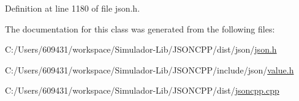 Definition at line 1180 of file json.\+h.



The documentation for this class was generated from the following files\+:\begin{DoxyCompactItemize}
\item 
C\+:/\+Users/609431/workspace/\+Simulador-\/\+Lib/\+J\+S\+O\+N\+C\+P\+P/dist/json/\hyperlink{dist_2json_2json_8h}{json.\+h}\item 
C\+:/\+Users/609431/workspace/\+Simulador-\/\+Lib/\+J\+S\+O\+N\+C\+P\+P/include/json/\hyperlink{value_8h}{value.\+h}\item 
C\+:/\+Users/609431/workspace/\+Simulador-\/\+Lib/\+J\+S\+O\+N\+C\+P\+P/dist/\hyperlink{jsoncpp_8cpp}{jsoncpp.\+cpp}\end{DoxyCompactItemize}
